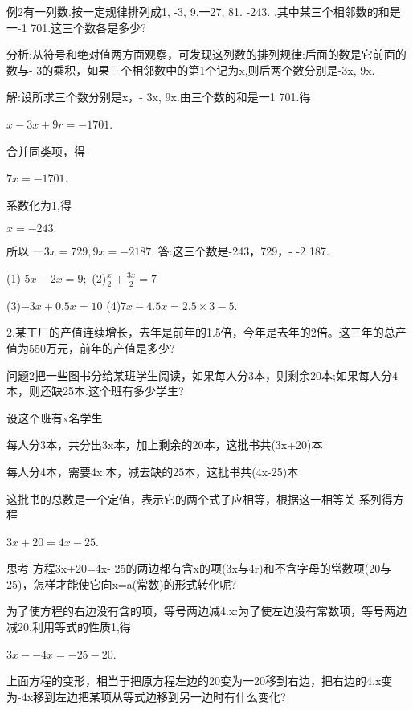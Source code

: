 \documentclass{article}
\begin{document}
\begin{article}
\begin{example}
      例2有一列数.按一定规律排列成1, -3, 9,一27, 81. -243. .其中某三个相邻数的和是一-1 701.这三个数各是多少?
      
      分析:从符号和绝对值两方面观察，可发现这列数的排列规律:后面的数是它前面的数与- 3的乘积，如果三个相邻数中的第1个记为x,则后两个数分别是-3x, 9x.      
      
      解:设所求三个数分别是x，- 3x, 9x.由三个数的和是一1 701.得 
      
      $x-3x+9r=-1701$. 
      
      合并同类项，得 
      
      $7x=-1 701$. 
      
      系数化为1,得
      
      $x=-243.$      
      
      所以      
      $一3x=729,9x=-2187$.      
      答:这三个数是-243，729，- -2 187.
      \end{example}
      
      \begin{exercise}
      (1) $5x-2x=9;$  (2)$\frac{x}{2}+\frac{3x}{2}=7$
      
      (3)$-3x+0.5x=10$ (4)$7x-4.5x=2.5\times3-5$.
      
      2.某工厂的产值连续增长，去年是前年的1.5倍，今年是去年的2倍。这三年的总产值为550万元，前年的产值是多少?
      \end{exercise}
      
      \begin{example}
      问题2把一些图书分给某班学生阅读，如果每人分3本，则剩余20本;如果每人分4本，则还缺25本.这个班有多少学生?
      
      设这个班有x名学生
      
      每人分3本，共分出3x本，加上剩余的20本，这批书共(3x+20)本
      
      每人分4本，需要4x:本，减去缺的25本，这批书共(4x-25)本
      
      这批书的总数是一个定值，表示它的两个式子应相等，根据这一相等关 系列得方程
      
      $3x+20=4x-25$.
     
     思考
     方程3x+20=4x- 25的两边都有含x的项(3x与4r)和不含字母的常数项(20与25)，怎样才能使它向x=a(常数)的形式转化呢?
     
     为了使方程的右边没有含的项，等号两边减4.x:为了使左边没有常数项，等号两边减20.利用等式的性质1,得
     
     $3x--4x=-25-20$.
     
     上面方程的变形，相当于把原方程左边的20变为一20移到右边，把右边的4.x变为-4x移到左边把某项从等式边移到另一边时有什么变化?
     

\end{example}
\end{article}
\end{document}
